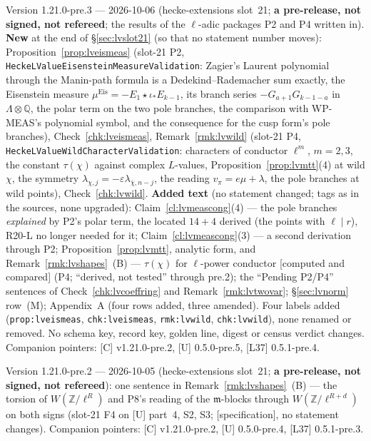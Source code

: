 \documentclass[11pt]{article}
\theoremstyle{remark}
\newcommand{\Z}{\mathbb{Z}}
\newcommand{\Q}{\mathbb{Q}}
\newcommand{\m}{\mathfrak{m}}
\newcommand{\CMPD}{\textsf{[computed and compared]}}   %
\newcommand{\SPEC}{\textsf{[specification]}}           %
\begin{document}
Version 1.21.0-pre.3 --- 2026-10-06 (hecke-extensions slot~21; \textbf{a pre-release, not signed, not refereed}; the results of the $\ell$-adic packages P2 and P4 written in).
\textbf{New} at the end of \S\ref{sec:lvslot21} (so that no statement number moves): Proposition~\ref{prop:lveismeas} (slot-21 P2, \texttt{HeckeLValueEisensteinMeasureValidation}: Zagier's
Laurent polynomial through the Manin-path formula is a Dedekind--Rademacher sum exactly, the Eisenstein measure $\mu^{\mathrm{Eis}}=-E_1\star\iota_\ast E_{k-1}$, its branch series
$-G_{a+1}G_{k-1-a}$ in $\Lambda\otimes\Q$, the polar term on the two pole branches, the comparison with WP-MEAS's polynomial symbol, and the consequence for the cusp form's pole branches),
Check~\ref{chk:lveismeas}, Remark~\ref{rmk:lvwild} (slot-21 P4, \texttt{HeckeLValueWildCharacterValidation}: characters of conductor $\ell^{m}$, $m=2,3$, the constant $\tau(\chi)$ against complex
$L$-values, Proposition~\ref{prop:lvmtt}(4) at wild $\chi$, the symmetry $\lambda_{\chi,j}=-\varepsilon\lambda_{\bar\chi,n-j}$, the reading $v_\pi=e\mu+\lambda$, the pole branches at wild points),
Check~\ref{chk:lvwild}. \textbf{Added text} (no statement changed; tags as in the sources, none upgraded): Claim~\ref{cl:lvmeascong}(4) --- the pole branches \emph{explained} by P2's polar term, the
located $14+4$ derived (the points with $\ell\mid r$), R20-L no longer needed for it; Claim~\ref{cl:lvmeascong}(3) --- a second derivation through P2; Proposition~\ref{prop:lvmtt}, analytic form, and
Remark~\ref{rmk:lvshapes}~(B) --- $\tau(\chi)$ for $\ell$-power conductor \CMPD{} (P4; ``derived, not tested'' through pre.2); the ``Pending P2/P4'' sentences of Check~\ref{chk:lvcoeffring} and
Remark~\ref{rmk:lvtwovar}; \S\ref{sec:lvnorm} row~(M); Appendix~A (four rows added, three amended). Four labels added (\texttt{prop:lveismeas}, \texttt{chk:lveismeas}, \texttt{rmk:lvwild},
\texttt{chk:lvwild}), none renamed or removed. No schema key, record key, golden line, digest or census verdict changes. Companion pointers: [C] v1.21.0-pre.2, [U] 0.5.0-pre.5, [L37] 0.5.1-pre.4.

Version 1.21.0-pre.2 --- 2026-10-05 (hecke-extensions slot~21; \textbf{a pre-release, not signed, not refereed}): one sentence in Remark~\ref{rmk:lvshapes}~(B) --- the torsion of
$W(\Z/\ell^{R})$ and P8's reading of the $\m$-blocks through $W(\Z/\ell^{R+d})$ on both signs (slot-21 F4 on [U] part~4, S2, S3; \SPEC, no statement changes). Companion pointers: [C]
v1.21.0-pre.2, [U] 0.5.0-pre.4, [L37] 0.5.1-pre.3.
\end{document}
